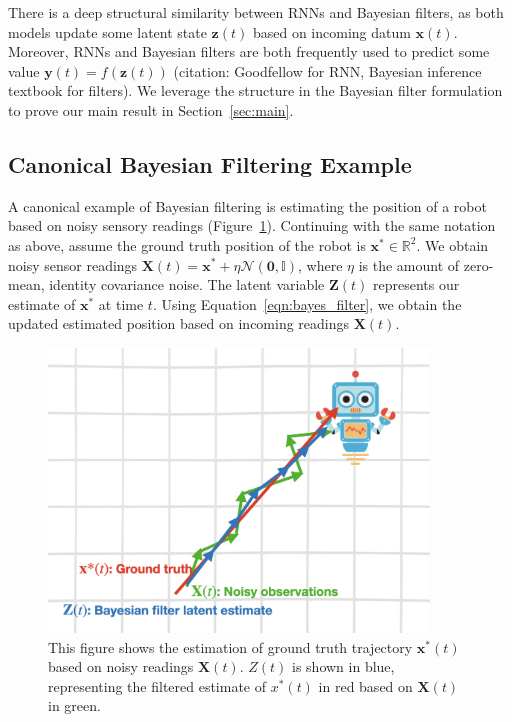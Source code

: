 \documentclass[12pt]{article}
\begin{document}
There is a deep structural similarity between RNNs and Bayesian filters, as
both models update some latent state $\mathbf z(t)$ based on incoming datum
$\mathbf x(t)$. 
Moreover, RNNs and Bayesian filters are both frequently used to predict some
value $\mathbf y(t) = f(\mathbf z(t))$ (citation: Goodfellow for RNN, Bayesian
inference textbook for filters).
We leverage the structure in the Bayesian filter formulation to prove our main
result in Section~\ref{sec:main}. 


\subsection{Canonical Bayesian Filtering Example}
A canonical example of Bayesian filtering is estimating the position of a robot based on noisy sensory readings (Figure~\ref{fig:robot_filter_ex}). 
Continuing with the same notation as above, assume the ground truth position of the robot is $\mathbf x^* \in \mathbb R^2$. 
We obtain noisy sensor readings $\mathbf X(t) = \mathbf x^* + \eta \mathcal N(\mathbf 0, \mathbb I)$, where $\eta$ is the amount of zero-mean, identity covariance noise. 
The latent variable $\mathbf Z(t)$ represents our estimate of $\mathbf x^*$ at time $t$. 
Using Equation~\ref{eqn:bayes_filter}, we obtain the updated estimated position based on incoming readings $\mathbf X(t)$. \\

\begin{figure}[h! tbp]
	\centering 
	\includegraphics[width=0.9\textwidth]{media/robot_filter.png}
	\caption[Canonical filtering task]{This figure shows the estimation of ground truth trajectory $\mathbf x^*(t)$ based on noisy readings $\mathbf X(t)$. $Z(t)$ is shown in blue, representing the filtered estimate of $x^*(t)$ in red based on $\mathbf X(t)$ in green.}
	\label{fig:robot_filter_ex}
\end{figure}
\end{document}
